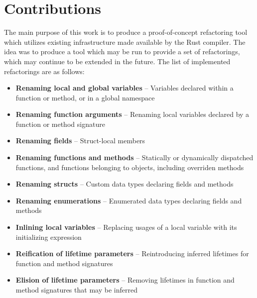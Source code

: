 
\section{Contributions}\label{S:implemented}
The main purpose of this work is to produce a proof-of-concept refactoring tool which utilizes existing infrastructure made available by the Rust compiler. The idea was to produce a tool which may be run to provide a set of refactorings, which may continue to be extended in the future. The list of implemented refactorings are as follows:


\begin{itemize}
\item {\bfseries Renaming local and global variables} -- Variables declared within a function or method, or in a global namespace
\item {\bfseries Renaming function arguments} -- Renaming local variables declared by a function or method signature
\item {\bfseries Renaming fields} -- Struct-local members
\item {\bfseries Renaming functions and methods} -- Statically or dynamically dispatched functions, and functions belonging to objects, including overriden methods
\item {\bfseries Renaming structs} -- Custom data types declaring fields and methods
\item {\bfseries Renaming enumerations} -- Enumerated data types declaring fields and methods
\item {\bfseries Inlining local variables} -- Replacing usages of a local variable with its initializing expression
\item {\bfseries Reification of lifetime parameters} -- Reintroducing inferred lifetimes for function and method signatures
\item {\bfseries Elision of lifetime parameters} -- Removing lifetimes in function and method signatures that may be inferred 
\end{itemize}

